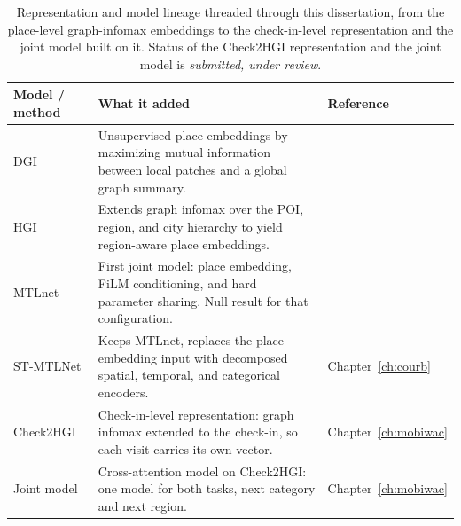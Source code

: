 \begin{table}[htbp]
  \centering
  \caption{Representation and model lineage threaded through this dissertation, from the
  place-level graph-infomax embeddings to the check-in-level representation and the joint
  model built on it. Status of the Check2HGI representation and the joint model is
  \emph{submitted, under review}.}
  \label{tab:fund:lineage}
  \begin{tabularx}{\textwidth}{@{}l>{\raggedright\arraybackslash}Xl@{}}
    \toprule
    Model / method & What it added & Reference \\
    \midrule
    DGI & Unsupervised place embeddings by maximizing mutual information between local patches and a global graph summary. & \cite{velickovic2019deep} \\
    \addlinespace
    HGI & Extends graph infomax over the POI, region, and city hierarchy to yield region-aware place embeddings. & \cite{huang2023hgi} \\
    \addlinespace
    MTLnet & First joint model: place embedding, FiLM conditioning, and hard parameter sharing. Null result for that configuration. & \cite{silva2025mtlnet} \\
    \addlinespace
    ST-MTLNet & Keeps MTLnet, replaces the place-embedding input with decomposed spatial, temporal, and categorical encoders. & Chapter~\ref{ch:courb} \\
    \addlinespace
    Check2HGI & Check-in-level representation: graph infomax extended to the check-in, so each visit carries its own vector. & Chapter~\ref{ch:mobiwac} \\
    \addlinespace
    Joint model & Cross-attention model on Check2HGI: one model for both tasks, next category and next region. & Chapter~\ref{ch:mobiwac} \\
    \bottomrule
  \end{tabularx}
\end{table}
